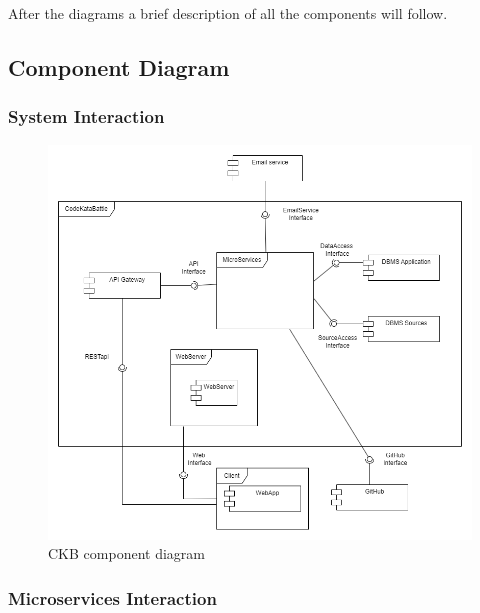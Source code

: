After the diagrams a brief description of all the components will follow.

\subsection{Component Diagram}

\subsubsection{System Interaction}

\begin{figure}[H]
    \centering
    \includegraphics[width=1\linewidth]{misc//Images/Component.png}
    \caption{\ac{CKB} component diagram}
    \label{fig:enter-label}
\end{figure}

\subsubsection{Microservices Interaction}

